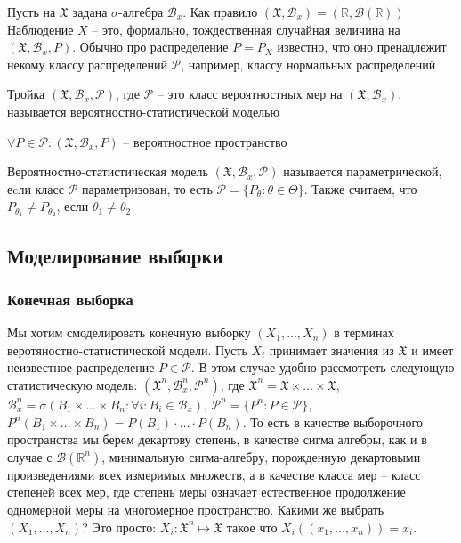 \documentclass[document.tex]{subfiles}
\begin{document}
\begin{remark}
	Пусть на $\mathfrak{X}$ задана $\sigma$-алгебра $\mathcal{B}_x$. Как правило $(\mathfrak{X}, \mathcal{B}_x) = (\mathbb{R}, \mathcal{B}(\mathbb{R}))$
	Наблюдение $X$ -- это, формально, тождественная случайная величина на $(\mathfrak{X}, \mathcal{B}_x, P)$. Обычно про распределение $P = P_X$ известно,
	что оно пренадлежит некому классу распределений $\mathcal{P}$, например, классу нормальных распределений
\end{remark}

\begin{definition}
	Тройка $(\mathfrak{X}, \mathcal{B}_x, \mathcal{P})$, где $\mathcal{P}$ -- это класс вероятностных мер на $(\mathfrak{X}, \mathcal{B}_x)$, называется
	вероятностно-статистической моделью
\end{definition}

\begin{remark}
	$\forall P \in \mathcal{P}: (\mathfrak{X}, \mathcal{B}_x, P)$ -- вероятностное пространство
\end{remark}

\begin{definition}
	Вероятностно-статистическая модель $(\mathfrak{X}, \mathcal{B}_x, \mathcal{P})$ называется параметрической, еcли класс $\mathcal{P}$ параметризован,
	то есть $\mathcal{P} = \{P_{\theta} : \theta \in \Theta\}$. Также считаем, что $P_{\theta_1} \neq P_{\theta_2}$, если $\theta_1 \neq \theta_2$
\end{definition}

\subsection{Моделирование выборки}
\subsubsection{Конечная выборка}
Мы хотим смоделировать конечную выборку $(X_1, \dots, X_n)$ в терминах веротяностно-статистической модели. Пусть $X_i$ принимает значения из $\mathfrak{X}$ и имеет
неизвестное распределение $P \in \mathcal{P}$. В этом случае удобно рассмотреть следующую статистическую модель: $(\mathfrak{X}^n, \mathcal{B}_x^n, \mathcal{P}^n)$, где $\mathfrak{X}^n = \mathfrak{X} \times \ldots \times \mathfrak{X}$, $\mathcal{B}_x^n = \sigma(B_1 \times \ldots \times B_n : \forall i : B_i \in \mathcal{B}_x)$,
$\mathcal{P}^n = \{P^n : P \in \mathcal{P}\}$, $P^n(B_1 \times \ldots \times B_n) = P(B_1) \cdot \ldots \cdot P(B_n)$. То есть в качестве выборочного пространства мы берем декартову степень, в качестве сигма алгебры, как и в случае с $\mathcal{B}(\mathbb{R}^n)$, минимальную сигма-алгебру, порожденную декартовыми произведениями всех измеримых множеств, а в качестве класса мер -- класс степеней всех мер, где степень меры означает естественное продолжение одномерной меры на многомерное пространство. Какими же выбрать $(X_1, \dots, X_n)$? Это просто: $X_i : \mathfrak{X}^n \mapsto \mathfrak{X}$ такое что $X_i((x_1, \dots, x_n)) = x_i$.
\end{document}

